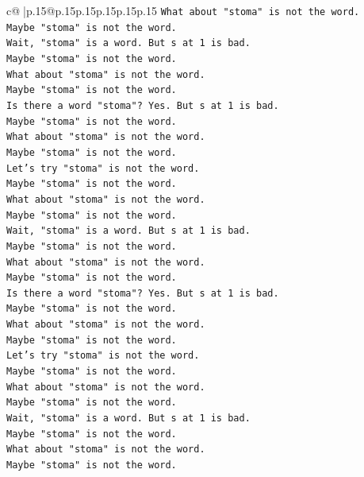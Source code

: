 \documentclass{article}
\begin{document}
{\begin{supertabular}{c@{$\;$}|p{.15\linewidth}@{}p{.15\linewidth}p{.15\linewidth}p{.15\linewidth}p{.15\linewidth}p{.15\linewidth}}
{{{\texttt{What about "stoma" is not the word.} \\
\texttt{Maybe "stoma" is not the word.} \\
\texttt{Wait, "stoma" is a word. But s at 1 is bad.} \\
\texttt{Maybe "stoma" is not the word.} \\
\texttt{What about "stoma" is not the word.} \\
\texttt{Maybe "stoma" is not the word.} \\
\texttt{Is there a word "stoma"? Yes. But s at 1 is bad.} \\
\texttt{Maybe "stoma" is not the word.} \\
\texttt{What about "stoma" is not the word.} \\
\texttt{Maybe "stoma" is not the word.} \\
\texttt{Let's try "stoma" is not the word.} \\
\texttt{Maybe "stoma" is not the word.} \\
\texttt{What about "stoma" is not the word.} \\
\texttt{Maybe "stoma" is not the word.} \\
\texttt{Wait, "stoma" is a word. But s at 1 is bad.} \\
\texttt{Maybe "stoma" is not the word.} \\
\texttt{What about "stoma" is not the word.} \\
\texttt{Maybe "stoma" is not the word.} \\
\texttt{Is there a word "stoma"? Yes. But s at 1 is bad.} \\
\texttt{Maybe "stoma" is not the word.} \\
\texttt{What about "stoma" is not the word.} \\
\texttt{Maybe "stoma" is not the word.} \\
\texttt{Let's try "stoma" is not the word.} \\
\texttt{Maybe "stoma" is not the word.} \\
\texttt{What about "stoma" is not the word.} \\
\texttt{Maybe "stoma" is not the word.} \\
\texttt{Wait, "stoma" is a word. But s at 1 is bad.} \\
\texttt{Maybe "stoma" is not the word.} \\
\texttt{What about "stoma" is not the word.} \\
\texttt{Maybe "stoma" is not the word.} \\
}}}
\end{supertabular}}
\end{document}
